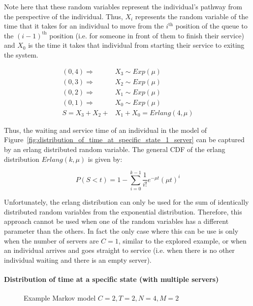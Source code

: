 Note here that these random variables represent the individual's pathway from
the perspective of the individual.
Thus, \(X_i\) represents the random variable of the time that it takes for an
individual to move from the \(i^{\text{th}}\) position of the queue to the
\((i-1)^{\text{th}}\) position (i.e. for someone in front of them to finish
their service) and \(X_0\) is the time it takes that individual from
starting their service to exiting the system.


\begin{align}
    (0,4) \Rightarrow \quad & X_3 \sim Exp(\mu) \nonumber \\
    (0,3) \Rightarrow \quad & X_2 \sim Exp(\mu) \nonumber \\
    (0,2) \Rightarrow \quad & X_1 \sim Exp(\mu) \nonumber \\
    (0,1) \Rightarrow \quad & X_0 \sim Exp(\mu) \nonumber \\
    S = X_3 + X_2 + & X_1 + X_0 = Erlang(4, \mu)
\end{align}

Thus, the waiting and service time of an individual in the model of
Figure~\ref{fig:distribution_of_time_at_specific_state_1_server}
can be captured by an
erlang distributed random variable.
The general CDF of the erlang distribution \(Erlang(k, \mu)\) is given by:

\begin{equation} \label{eq:cdf_erlang}
    P(S < t) = 1 - \sum_{i=0}^{k-1} \frac{1}{i!} e^{-\mu t} (\mu t)^i
\end{equation}

Unfortunately, the erlang distribution can only be used for the sum of
identically distributed random variables from the exponential distribution.
Therefore, this approach cannot be used when one of the random variables has a
different parameter than the others.
In fact the only case where this can be use is only when the number of servers 
are \(C=1\), similar to the explored example, or when an individual arrives
and goes straight to service (i.e. when there is no other individual waiting
and there is an empty server).


\paragraph{Distribution of time at a specific state (with multiple servers)}

\begin{figure}[h]
    \centering
    \scalebox{0.75}{}
    \caption{Example Markov model \(C=2, T=2, N=4, M=2\)}
    \label{fig:distribution_of_time_at_specific_state_2_servers}
\end{figure}

